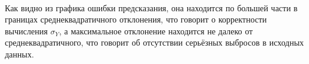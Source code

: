 \documentclass[12pt]{report}
\begin{document}
    \begin{center}
    \end{center}
    { \hspace*{\fill} \\}
    
    Как видно из графика ошибки предсказания, она находится по большей части
в границах среднеквадратичного отклонения, что говорит о корректности
вычисления \(\sigma_{Y}\), а максимальное отклонение находится не далеко
от среднеквадратичного, что говорит об отсутствии серьёзных выбросов в
исходных данных.


    
    
    
\end{document}
